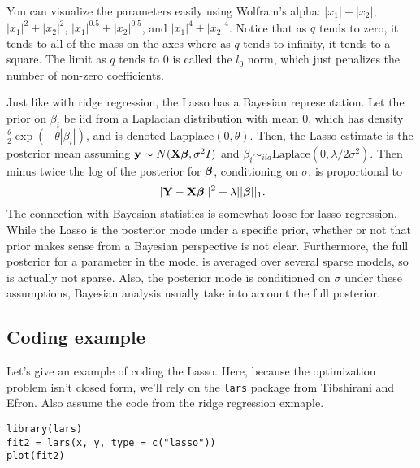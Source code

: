 You can visualize the parameters easily using Wolfram's alpha:
\href{http://www.wolframalpha.com/input/?i=abs\%28x1\%29+\%2B+abs\%28x2\%29+\%3D+1}{$|x_1| + |x_2|$},
\href{http://www.wolframalpha.com/input/?i=abs\%28x1\%29\%5E2+\%2B+abs\%28x2\%29\%5E2+\%3D+1}{$|x_1|^2 + |x_2|^2$},
\href{http://www.wolframalpha.com/input/?i=abs\%28x1\%29\%5E0.5+\%2B+abs\%28x2\%29\%5E0.5+\%3D+1}{$|x_1|^0.5 + |x_2|^0.5$},
and \href{http://www.wolframalpha.com/input/?i=plot+abs\%28x1\%29\%5E4+\%2B+abs\%28x2\%29\%5E4+\%3D+1}{$|x_1|^4 + |x_2|^4$}.
Notice that as $q$ tends to zero, it tends to all of the mass on the axes where as $q$ tends to infinity, it tends
to a square. The limit as $q$ tends to 0 is called the $l_0$ norm, which just penalizes the number
of non-zero coefficients. 

Just like with ridge regression, the Lasso has a Bayesian representation. Let
the prior on $\beta_i$ be iid from a Laplacian distribution with mean 0, which has
density $\frac{\theta}{2}\exp(- \theta |\beta_i|)$, and is denoted Lapplace$(0, \theta)$. 
Then, the Lasso estimate is
the posterior mean assuming $\mathbf{y} \sim N(\mathbf{X} \boldsymbol{\beta}, \sigma^2 I)$ and 
$\beta_i \sim_{iid} \mbox{Laplace}(0, \lambda / 2\sigma^2)$. Then minus twice 
the log of the posterior for $\boldsymbol{\beta}$, conditioning on $\sigma$, is proportional to
$$
||\mathbf{Y} - \mathbf{X} \boldsymbol{\beta}||^2 + \lambda ||\boldsymbol{\beta}||_{1}.
$$
The connection with Bayesian statistics is somewhat loose for lasso regression. 
While the Lasso is the posterior mode under a specific prior, whether or not that
prior makes sense from a Bayesian perspective is not clear. Furthermore, the full
posterior for a parameter in the model 
is averaged over several sparse models, so is actually not sparse. 
Also, the posterior mode is conditioned on $\sigma$ under these assumptions, Bayesian analysis usually
take into account the full posterior.


\subsection{Coding example}

Let's give an example of coding the Lasso. Here, because the optimization
problem isn't closed form, we'll rely on the \texttt{lars} package from
Tibshirani and Efron. Also assume the code from the ridge regression exmaple.

\begin{verbatim}
library(lars)
fit2 = lars(x, y, type = c("lasso"))
plot(fit2)
\end{verbatim}



